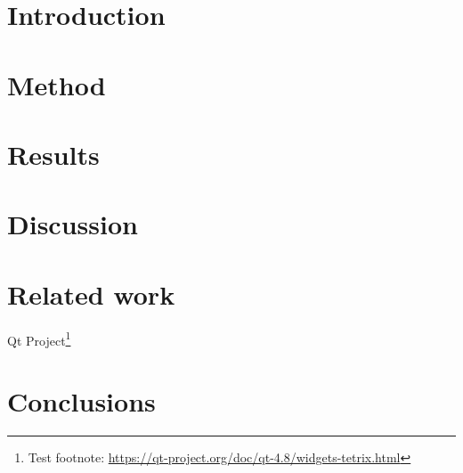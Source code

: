 \documentclass{ml}
\begin{document}

\section{Introduction}

\section{Method}

\section{Results}

\section{Discussion}

\section{Related work}
\cite{wwwtetrix}
Qt Project\footnote{Test footnote: \url{https://qt-project.org/doc/qt-4.8/widgets-tetrix.html}}
\cite{szepesvari2010algorithms}
\cite{szita2006learning}
\cite{carr2005applying}
\cite{gross2008learningto}

\section{Conclusions}

\newpage


\end{document}
